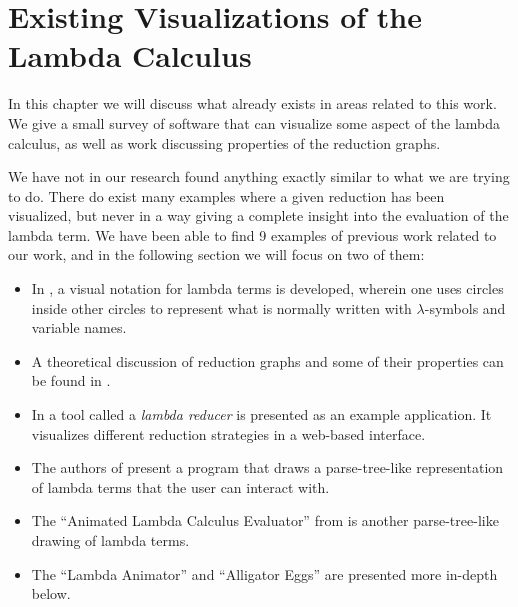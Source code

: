 
\chapter{Existing Visualizations of the Lambda Calculus}

In this chapter we will discuss what already exists in areas related to this
work. We give a small survey of software that can visualize some aspect of the
lambda calculus, as well as work discussing properties of the reduction
graphs.

We have not in our research found anything exactly similar to what we are
trying to do. There do exist many examples where a given reduction has been
visualized, but never in a way giving a complete insight into the evaluation
of the lambda term. We have been able to find 9 examples of previous work
related to our work, and in the following section we will focus on two of
them:
\begin{itemize}
	\item In \cite{Citrin+Hall+Zorn+1995a}, a visual notation for lambda terms 
	is developed, wherein one uses circles inside other circles to represent
	what is normally written with $\lambda$-symbols and variable names.
	
	\item A theoretical discussion of reduction graphs and some of their properties
	can be found in \cite{VenturiniZilli1984251,297368}. 
	
	\item In \cite{Sestoft96standardml} a tool called a \emph{lambda reducer} is 
	presented as an example application. It visualizes different reduction 
	strategies in a web-based interface.
	
	\item The authors of \cite{DBLP:journals/entcs/RuizV09} present a program
	that draws a parse-tree-like representation of lambda terms that the user can interact
	with. 
	
	\item The ``Animated Lambda Calculus Evaluator'' from \cite{AnimatedLambdaCalculusEvaluator}
	is another parse-tree-like drawing of lambda terms.
	
	\item The ``Lambda Animator'' \cite{lambdaAnimatorThyer} and ``Alligator Eggs'' \cite{Alligator}
	are presented more in-depth below.
	
\end{itemize}

